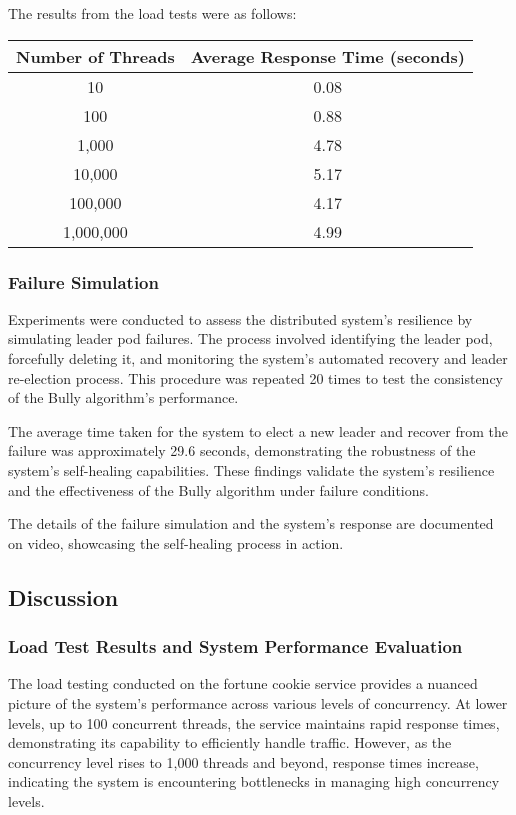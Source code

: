 \documentclass{article}
\begin{document}
        The results from the load tests were as follows:

        \begin{center}
        \begin{tabular}{ |c|c| }
        \hline
        Number of Threads & Average Response Time (seconds) \\
        \hline
        10 & 0.08 \\
        100 & 0.88 \\
        1,000 & 4.78 \\
        10,000 & 5.17 \\
        100,000 & 4.17 \\
        1,000,000 & 4.99 \\
        \hline
        \end{tabular}
        \end{center}

        \subsubsection{Failure Simulation}
        Experiments were conducted to assess the distributed system's resilience by simulating leader pod failures. The process involved identifying the leader pod, forcefully deleting it, and monitoring the system's automated recovery and leader re-election process. This procedure was repeated 20 times to test the consistency of the Bully algorithm's performance.
        
        The average time taken for the system to elect a new leader and recover from the failure was approximately 29.6 seconds, demonstrating the robustness of the system's self-healing capabilities. These findings validate the system's resilience and the effectiveness of the Bully algorithm under failure conditions.
        
        The details of the failure simulation and the system's response are documented on video\cite{youtubevideo}, showcasing the self-healing process in action.
        
   

  \subsection{Discussion}
    \subsubsection*{Load Test Results and System Performance Evaluation}
      The load testing conducted on the fortune cookie service provides a nuanced picture of the system's performance across various levels of concurrency. At lower levels, up to 100 concurrent threads, the service maintains rapid response times, demonstrating its capability to efficiently handle traffic. However, as the concurrency level rises to 1,000 threads and beyond, response times increase, indicating the system is encountering bottlenecks in managing high concurrency levels.
      
\end{document}
